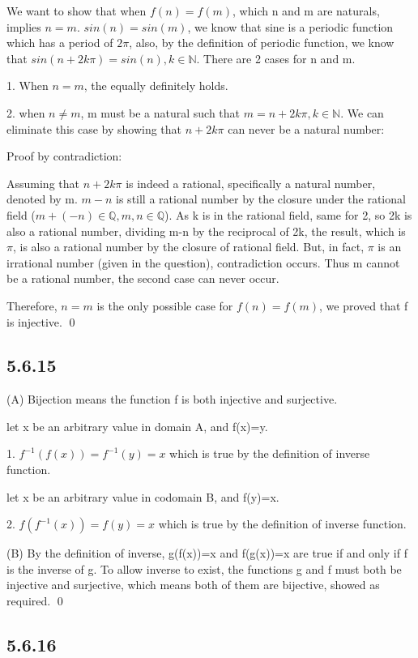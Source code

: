 \documentclass{article}
\begin{document}
We want to show that when $f(n)=f(m)$, which n and m are naturals, implies $n=m$. $sin(n)=sin(m)$, we know that sine is a periodic function which has a period of $2\pi$, also, by the definition of periodic function, we know that $sin(n+2k\pi)=sin(n),k\in\mathbb{N}$. There are 2 cases for n and m.

1. When $n=m$, the equally definitely holds.

2. when $n\neq m$, m must be a natural such that $m=n+2k\pi,k\in\mathbb{N}$. We can eliminate this case by showing that $n+2k\pi$ can never be a natural number:

Proof by contradiction:

Assuming that $n+2k\pi$ is indeed a rational, specifically a natural number, denoted by m. $m-n$ is still a rational number by the closure under the rational field ($m+(-n)\in\mathbb{Q}, m,n\in\mathbb{Q}$). As k is in the rational field, same for 2, so 2k is also a rational number, dividing m-n by the reciprocal of 2k, the result, which is $\pi$, is also a rational number by the closure of rational field. But, in fact, $\pi$ is an irrational number (given in the question), contradiction occurs. Thus m cannot be a rational number, the second case can never occur.

Therefore, $n=m$ is the only possible case for $f(n)=f(m)$, we proved that f is injective. \qed

\subsection*{5.6.15}

(A) Bijection means the function f is both injective and surjective.

let x be an arbitrary value in domain A, and f(x)=y.

1. $f^{-1}(f(x))=f^{-1}(y)=x$ which is true by the definition of inverse function.

let x be an arbitrary value in codomain B, and f(y)=x.

2. $f(f^{-1}(x))=f(y)=x$ which is true by the definition of inverse function.

(B) By the definition of inverse, g(f(x))=x and f(g(x))=x are true if and only if f is the inverse of g. To allow inverse to exist, the functions g and f must both be injective and surjective, which means both of them are bijective, showed as required. \qed

\subsection*{5.6.16}
\end{document}
